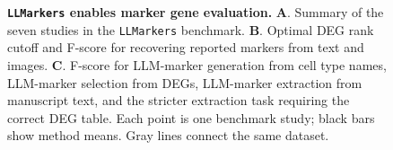 \begin{figure}[ht!]
  \centering
  
  \caption{\textbf{\texttt{LLMarkers} enables marker gene evaluation.} \textbf{A}. Summary of the seven studies in the \texttt{LLMarkers} benchmark. \textbf{B}. Optimal DEG rank cutoff and F-score for recovering reported markers from text and images. \textbf{C}. F-score for LLM-marker generation from cell type names, LLM-marker selection from DEGs, LLM-marker extraction from manuscript text, and the stricter extraction task requiring the correct DEG table. Each point is one benchmark study; black bars show method means. Gray lines connect the same dataset.}
  \label{fig:marker_selection}%
  \label{fig:llm_curation}%
\end{figure}
